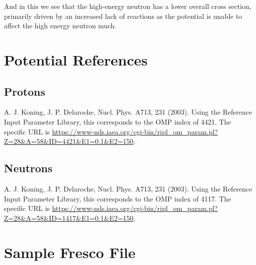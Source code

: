\documentclass[paper=a4, fontsize=11pt]{scrartcl} %
\numberwithin{equation}{section} %
\numberwithin{figure}{section} %
\numberwithin{table}{section} %
\begin{document}
And in this we see that the high-energy neutron has a lower overall cross section, primarily driven by an increased lack of reactions as the potential is unable to affect the high energy neutron much.


\section{ Potential References}

\subsection{Protons} A. J. Koning, J. P. Delaroche, Nucl. Phys. A713, 231 (2003). Using the Reference Input Parameter Library, this corresponds to the OMP index of 4421. The specific URL is \url{https://www-nds.iaea.org/cgi-bin/ripl_om_param.pl?Z=28&A=58&ID=4421&E1=0.1&E2=150}.
\subsection{Neutrons}A. J. Koning, J. P. Delaroche, Nucl. Phys. A713, 231 (2003). Using the Reference Input Parameter Library, this corresponds to the OMP index of 4117. The specific URL is \url{https://www-nds.iaea.org/cgi-bin/ripl_om_param.pl?Z=28&A=58&ID=1417&E1=0.1&E2=150}.

\section{Sample Fresco File}

\end{document}
